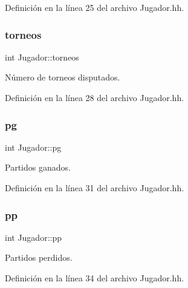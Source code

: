 Definición en la línea 25 del archivo Jugador.\+hh.

\mbox{\label{class_jugador_a2c4256c69ddf76e1c4f1e48f56ed305c}} 
\subsubsection{\texorpdfstring{torneos}{torneos}}
{\footnotesize\ttfamily int Jugador\+::torneos\hspace{0.3cm}{\ttfamily [private]}}



Número de torneos disputados. 



Definición en la línea 28 del archivo Jugador.\+hh.

\mbox{\label{class_jugador_ab254a72417747985ffaf53b0508e5e31}} 
\subsubsection{\texorpdfstring{pg}{pg}}
{\footnotesize\ttfamily int Jugador\+::pg\hspace{0.3cm}{\ttfamily [private]}}



Partidos ganados. 



Definición en la línea 31 del archivo Jugador.\+hh.

\mbox{\label{class_jugador_a90af14828909d3c5cd3fb4a285e96daf}} 
\subsubsection{\texorpdfstring{pp}{pp}}
{\footnotesize\ttfamily int Jugador\+::pp\hspace{0.3cm}{\ttfamily [private]}}



Partidos perdidos. 



Definición en la línea 34 del archivo Jugador.\+hh.

\mbox{\label{class_jugador_a678970fa93782e3e68f939c37fff5030}} 
